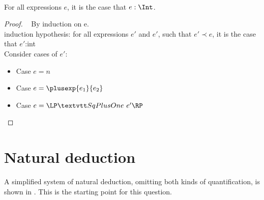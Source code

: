 \begin{conjecture} ~\\
  For all expressions $e$,
  it is the case that $e : \Int$.
\end{conjecture}
\begin{proof} ~
  By induction on e.\\
  induction hypothesis: for all expressions $e'$ and $e'$, such that $e'\prec e$, it is the case that $e'$:int\\
  Consider cases of $e'$:
  
  \begin{itemize}
  \item Case $e = n$\\
  \begin{llproof}
  \end{llproof}
  \item Case $e = \plusexp{e_1}{e_2}$\\
  \begin{llproof}
  \end{llproof}
  \item Case $e = \sqplusoneexp{e'}$\\
  \begin{llproof}
  \end{llproof}
  \end{itemize}
  \vfill
\end{proof}


\clearpage

\section{Natural deduction}

A simplified system of natural deduction, omitting both kinds of quantification, 
is shown in .  This is the starting point for this question.


